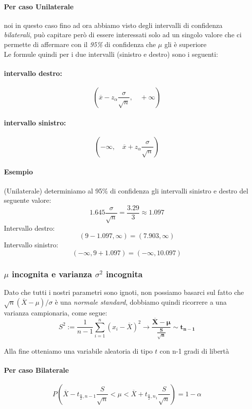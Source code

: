 \documentclass[]{article}
\begin{document}
    \paragraph{Per caso Unilaterale} noi in questo caso fino ad ora abbiamo visto degli intervalli di confidenza \textit{bilaterali}, può capitare però di essere interessati solo ad un singolo valore che ci permette di affermare con il \textit{95\%} di confidenza che $\mu$ gli è superiore \\
    Le formule quindi per i due intervalli (sinistro e destro) sono i seguenti:
    \paragraph{intervallo destro:}
    \[ \left( \overline{x} - z_\alpha \frac{\sigma}{\sqrt{n}},\quad  +\infty \right) \]
    \paragraph{intervallo sinistro:}
    \[ \left( -\infty,\quad \overline{x} + z_\alpha \frac{\sigma}{\sqrt{n}} \right) \]
    \paragraph{Esempio} (Unilaterale) determiniamo al 95\% di confidenza gli intervalli sinistro e destro del seguente valore:
    \[ 1.645 \frac{\sigma}{\sqrt{n}} = \frac{3.29}{3} \approx 1.097 \]
    Intervallo destro:
    \[ (9-1.097, \infty) = (7.903, \infty) \]
    Intervallo sinistro:
    \[ (-\infty, 9+1.097) = (-\infty, 10.097) \]
    \subsubsection{$\mu$ incognita e varianza  $\sigma^2$ incognita}
    Dato che tutti i nostri parametri sono ignoti, non possiamo basarci sul fatto che $\sqrt{n}(\overline{X} - \mu) / \sigma$ è una \textit{normale standard}, dobbiamo quindi ricorrere a una varianza campionaria, come segue:
    \[ S^2 := \frac{1}{n-1} \sum_{i=1}^{n} (x_i - \overline{X})^2 \longrightarrow \boldsymbol{\frac{\overline{X} - \mu}{\frac{S}{\sqrt{n}}} \sim t_{n-1}}\]
    \centerline{Alla fine otteniamo una variabile aleatoria di tipo $t$ con n-1 gradi di libertà}
    \paragraph{Per caso Bilaterale}
    \[ P \left( \overline{X} - t_{\frac{\alpha}{2}, n-1} \frac{S}{\sqrt{n}} < \mu < \overline{X} + t_{\frac{\alpha}{2}, n_1} \frac{S}{\sqrt{n}} \right) = 1 - \alpha \]
\end{document}
